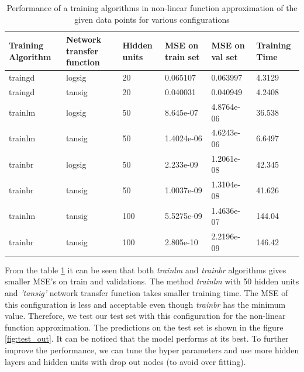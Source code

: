 \begin{table}[!htpb]
	\centering
	\begin{tabular}[t]{|>{\centering}p{2cm}|p{2cm}|p{2cm}|p{2cm}|p{2cm}|p{2cm}|}
		
		\cellcolor{blue!25}Training Algorithm & \cellcolor{blue!25} Network transfer function& \cellcolor{blue!25}Hidden units  & \cellcolor{blue!25} MSE on train set & \cellcolor{blue!25} MSE on val set & \cellcolor{blue!25} Training Time\\ \hline
		traingd &  logsig& 20 & 0.065107 & 0.063997 & 4.3129 \\ \hline
		traingd &  tansig& 20 & 0.040031 & 0.040949 & 4.2408 \\ \hline
	
		trainlm &  logsig& 50 & 8.645e-07 & 4.8764e-06 & 36.538 \\ \hline
		trainlm &  tansig& 50 & 1.4024e-06 & 4.6243e-06 & 6.6497 \\ \hline			
	
		trainbr &  logsig& 50 & 2.233e-09 &1.2061e-08 & 42.345 \\ \hline
		trainbr &  tansig& 50 & 1.0037e-09 & 1.3104e-08 & 41.626 \\ \hline
		
		trainlm &  tansig& 100 & 5.5275e-09 &1.4636e-07 & 144.04 \\ \hline
		trainbr &  tansig& 100 & 2.805e-10 & 2.2196e-09 & 146.42 \\ \hline
	\end{tabular}
	\captionsetup{format = hang}
	\caption{Performance of a training algorithms in non-linear function approximation of the given data points for various configurations}
	\label{table:1.1} 
\end{table}
From the table \ref{table:1.1} it can be seen that both \textit{trainlm} and \textit{trainbr} algorithms gives smaller MSE's on train and validations.  The method \textit{trainlm} with 50 hidden units and \textit{'tansig'} network transfer function takes smaller training time. The MSE of this configuration is less and acceptable even though \textit{trainbr} has the minimum value. Therefore, we test our test set with this configuration for the non-linear function approximation. The predictions on the test set is shown in the figure \ref{fig:test_out}. It can be noticed that the model performs at its best. To further improve the performance, we can tune the hyper parameters and use more hidden layers and hidden units with drop out nodes (to avoid over fitting).

